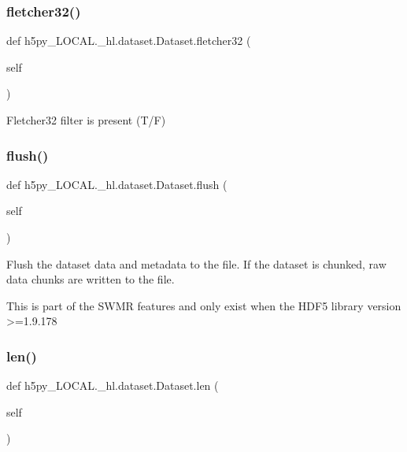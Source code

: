 \subsubsection{\texorpdfstring{fletcher32()}{fletcher32()}}
{\footnotesize\ttfamily def h5py\+\_\+\+L\+O\+C\+A\+L.\+\_\+hl.\+dataset.\+Dataset.\+fletcher32 (\begin{DoxyParamCaption}\item[{}]{self }\end{DoxyParamCaption})}

\begin{DoxyVerb}Fletcher32 filter is present (T/F)\end{DoxyVerb}
 \mbox{\label{classh5py__LOCAL_1_1__hl_1_1dataset_1_1Dataset_a7fd0818fbce609222cc332155abd8441}} 
\subsubsection{\texorpdfstring{flush()}{flush()}}
{\footnotesize\ttfamily def h5py\+\_\+\+L\+O\+C\+A\+L.\+\_\+hl.\+dataset.\+Dataset.\+flush (\begin{DoxyParamCaption}\item[{}]{self }\end{DoxyParamCaption})}

\begin{DoxyVerb}Flush the dataset data and metadata to the file.
If the dataset is chunked, raw data chunks are written to the file.

This is part of the SWMR features and only exist when the HDF5
library version >=1.9.178
\end{DoxyVerb}
 \mbox{\label{classh5py__LOCAL_1_1__hl_1_1dataset_1_1Dataset_a523856449c04daa8c3dd06b610f51fef}} 
\subsubsection{\texorpdfstring{len()}{len()}}
{\footnotesize\ttfamily def h5py\+\_\+\+L\+O\+C\+A\+L.\+\_\+hl.\+dataset.\+Dataset.\+len (\begin{DoxyParamCaption}\item[{}]{self }\end{DoxyParamCaption})}

